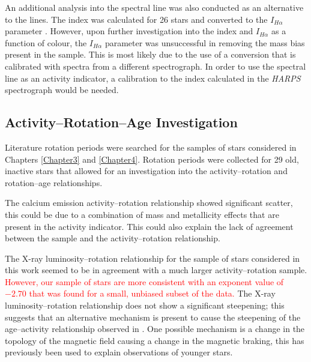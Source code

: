 An additional analysis into the \Halpha spectral line was also conducted as an alternative to the \caII lines. The \Halpha index was calculated for 26 stars and converted to the $I_{H\alpha}$ parameter \citep{Gomes_da_Silva_etal_2014}. However, upon further investigation into the \Halpha index and $I_{H\alpha}$ as a function of colour, the $I_{H\alpha}$ parameter was unsuccessful in removing the mass bias present in the sample. This is most likely due to the use of a conversion that is calibrated with spectra from a different spectrograph. In order to use the \Halpha spectral line as an activity indicator, a calibration to the \Halpha index calculated in the \textit{HARPS} spectrograph would be needed.

\subsection{Activity--Rotation--Age Investigation}

Literature rotation periods were searched for the samples of stars considered in Chapters \ref{Chapter3} and \ref{Chapter4}. Rotation periods were collected for 29 old, inactive stars that allowed for an investigation into the activity--rotation and rotation--age relationships.

The calcium emission activity--rotation relationship showed significant scatter, this could be due to a combination of mass and metallicity effects that are present in the \Rprime activity indicator. This could also explain the lack of agreement between the sample and the \citet{Mamajek_Hillenbrand_2008} activity--rotation relationship.

The X-ray luminosity--rotation relationship for the sample of stars considered in this work seemed to be in agreement with a much larger activity--rotation sample. \textcolor{red}{However, our sample of stars are more consistent with an exponent value of $-2.70$ that was found for a small, unbiased subset of the \citet{Wright_etal_2011} data.} The X-ray luminosity--rotation relationship does not show a significant steepening; this suggests that an alternative mechanism is present to cause the steepening of the age--activity relationship observed in \citet{Booth_etal_2017}. One possible mechanism is a change in the topology of the magnetic field causing a change in the magnetic braking, this has previously been used to explain observations of younger stars.

